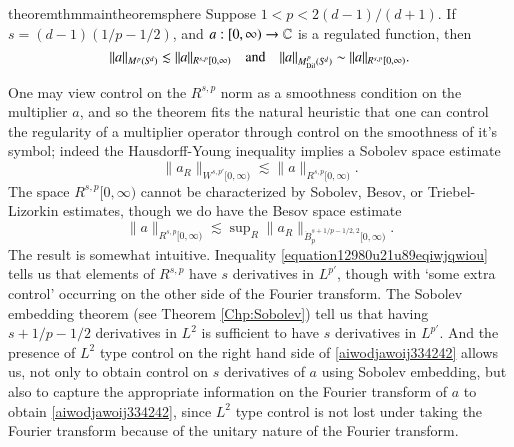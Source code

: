 \begin{restatable}{theorem}{thmmaintheoremsphere} \label{maintheoremsphere}
  Suppose $1 < p < 2(d-1)/(d+1)$. If $s = (d-1)(1/p - 1/2)$, and $a: [0,\infty) \to \operatorname{\mathbb{C}}$ is a regulated function, then
  \[ \| a \|_{M^p({S}^{\!{d}})} \lesssim \| a \|_{R^{s,p}[0,\infty)} \quad\text{and}\quad \| a \|_{M^p_{\text{Dil}}({S}^{\!{d}})} \sim \| a \|_{R^{s,p}[0,\infty)}. \]
\end{restatable}

One may view control on the $R^{s,p}$ norm as a smoothness condition on the multiplier $a$, and so the theorem fits the natural heuristic that one can control the regularity of a multiplier operator through control on the smoothness of it's symbol; indeed the Hausdorff-Young inequality implies a Sobolev space estimate
%
\begin{equation} \label{equation12980u21u89eqiwjqwiou}
  \| a_R \|_{W^{s,p'}[0,\infty)} \lesssim \| a \|_{R^{s,p}[0,\infty)}.
\end{equation}
%
The space $R^{s,p}[0,\infty)$ cannot be characterized by Sobolev, Besov, or Triebel-Lizorkin estimates, though we do have the Besov space estimate
%
\begin{equation} \label{aiwodjawoij334242}
  \| a \|_{R^{s,p}[0,\infty)} \lesssim \sup\nolimits_R \| a_R \|_{\dot{B}^{s+1/p - 1/2,2}_p[0,\infty)}.
\end{equation}
%
The result is somewhat intuitive. Inequality \eqref{equation12980u21u89eqiwjqwiou} tells us that elements of $R^{s,p}$ have $s$ derivatives in $L^{p'}$, though with `some extra control' occurring on the other side of the Fourier transform. The Sobolev embedding theorem (see Theorem \ref{Chp:Sobolev}) tell us that having $s + 1/p - 1/2$ derivatives in $L^2$ is sufficient to have $s$ derivatives in $L^{p'}$. And the presence of $L^2$ type control on the right hand side of \eqref{aiwodjawoij334242} allows us, not only to obtain control on $s$ derivatives of $a$ using Sobolev embedding, but also to capture the appropriate information on the Fourier transform of $a$ to obtain \eqref{aiwodjawoij334242}, since $L^2$ type control is not lost under taking the Fourier transform because of the unitary nature of the Fourier transform.

